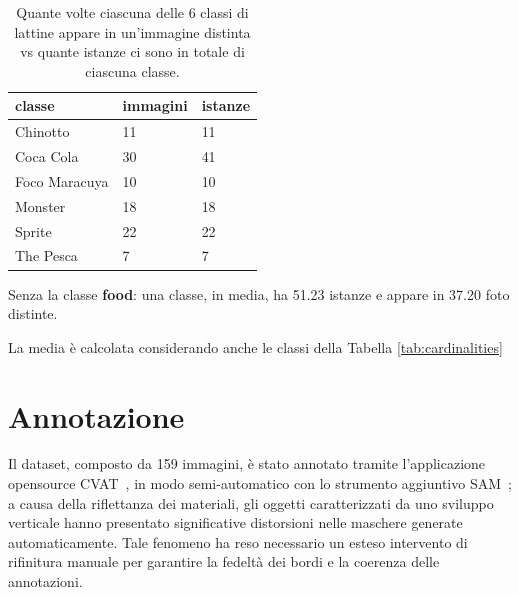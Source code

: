 \documentclass[../main.tex]{subfiles}
\begin{document}
\begin{table}[h!]
    \centering
    \caption{Quante volte ciascuna delle 6 classi di lattine appare in un'immagine distinta vs quante istanze ci sono in totale di ciascuna classe.}
    \label{tab:cardinalities_alluminum_cans}
    \begin{tabular}{|l|l|l|}
        \hline
        \textbf{classe} & \textbf{immagini} & \textbf{istanze} \\ \hline
        Chinotto & 11 & 11 \\ \hline
        Coca Cola & 30 & 41 \\ \hline
        Foco Maracuya & 10 & 10 \\ \hline
        Monster & 18 & 18 \\ \hline
        Sprite & 22 & 22 \\ \hline
        The Pesca & 7 & 7 \\ \hline
    \end{tabular}
    \begin{tablenotes}
        \small
        \item[1] Senza la classe \textbf{food}: una classe, in media, ha 51.23 istanze e appare in 37.20 foto distinte.
        \center
        \item[] La media è calcolata considerando anche le classi della Tabella \ref{tab:cardinalities}
    \end{tablenotes}
\end{table}

\clearpage

\section{Annotazione}
Il dataset, composto da 159 immagini, è stato annotato tramite l'applicazione \gls{opensource} CVAT~\cite{cvat}, in modo semi-automatico con lo strumento aggiuntivo SAM~\cite{kirillov2023segment}; a causa della riflettanza dei materiali, gli oggetti caratterizzati da uno sviluppo verticale hanno presentato significative distorsioni nelle maschere generate automaticamente. Tale fenomeno ha reso necessario un esteso intervento di rifinitura manuale per garantire la fedeltà dei bordi e la coerenza delle annotazioni.
\end{document}
